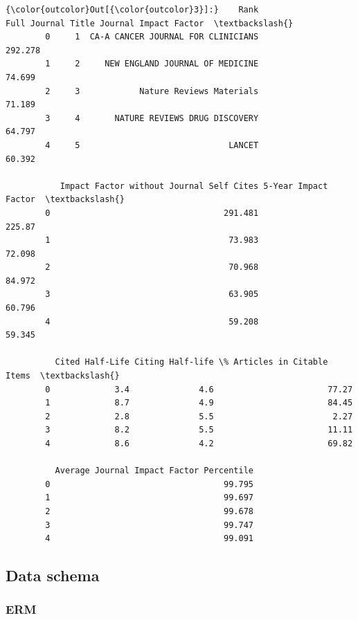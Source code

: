\documentclass[11pt]{article}
\begin{document}
\begin{Verbatim}[commandchars=\\\{\}]
{\color{outcolor}Out[{\color{outcolor}3}]:}    Rank                  Full Journal Title Journal Impact Factor  \textbackslash{}
        0     1  CA-A CANCER JOURNAL FOR CLINICIANS               292.278   
        1     2     NEW ENGLAND JOURNAL OF MEDICINE                74.699   
        2     3            Nature Reviews Materials                71.189   
        3     4       NATURE REVIEWS DRUG DISCOVERY                64.797   
        4     5                              LANCET                60.392   
        
           Impact Factor without Journal Self Cites 5-Year Impact Factor  \textbackslash{}
        0                                   291.481               225.87   
        1                                    73.983               72.098   
        2                                    70.968               84.972   
        3                                    63.905               60.796   
        4                                    59.208               59.345   
        
          Cited Half-Life Citing Half-life \% Articles in Citable Items  \textbackslash{}
        0             3.4              4.6                       77.27   
        1             8.7              4.9                       84.45   
        2             2.8              5.5                        2.27   
        3             8.2              5.5                       11.11   
        4             8.6              4.2                       69.82   
        
          Average Journal Impact Factor Percentile  
        0                                   99.795  
        1                                   99.697  
        2                                   99.678  
        3                                   99.747  
        4                                   99.091  
\end{Verbatim}
            
    \subsection{Data schema}\label{data-schema}

\subsubsection{ERM}\label{erm}
\end{document}
